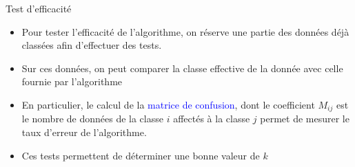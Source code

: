 \documentclass[10pt]{beamer}
\begin{document}
\begin{frame}{\Ctitle}{\stitle}
    \begin{block}{Test d'efficacité}
        \begin{itemize}
        \item<1-> Pour tester l'efficacité de l'algorithme, on réserve une partie des données déjà classées afin d'effectuer des tests. 
        \item<2-> Sur ces données, on peut  comparer la classe effective de la donnée avec celle fournie par l'algorithme 
        \item<3-> En particulier, le calcul de la  \textcolor{blue}{matrice de confusion}, dont le coefficient $M_{ij}$ est le nombre de données de la classe $i$ affectés à la classe $j$ permet de mesurer le taux d'erreur de l'algorithme.
        \item<4-> Ces tests permettent de déterminer une \og{} bonne \fg{} valeur de $k$
        \end{itemize}
    \end{block}
\end{frame}
\end{document}
